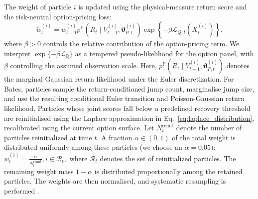\documentclass[sigconf,anonymous,review]{acmart}
\begin{document}
The weight of particle \(i\) is updated using the physical-measure return score and the risk-neutral option-pricing loss:
%
\begin{equation}
\label{eq:joint_weight}
\widetilde{w}_t^{(i)}
=
w_{t-1}^{(i)}
p^{\mathbb{P}}
\left(
R_t \mid V_{t-1}^{(i)},
\boldsymbol{\vartheta}_{P,t}^{(i)}
\right)
\exp\left\{
-\beta
\mathcal{L}_{Q,t}
\left(X_t^{(i)}\right)
\right\}.
\end{equation}
%
where \(\beta>0\) controls the relative contribution of the option-pricing term. We interpret $\exp\{-\beta\mathcal L_{\mathbb Q}\}$ as a tempered pseudo-likelihood for the option panel, with $\beta$ controlling the assumed observation scale. Here,
$p^{\mathbb{P}}(R_t\mid V_{t-1}^{(i)},
\boldsymbol{\vartheta}_{P,t}^{(i)})$
denotes the marginal Gaussian return likelihood under the Euler discretization.
For Bates, particles sample the return-conditioned jump count, marginalise jump size, and use the resulting conditional Euler
transition and Poisson-Gaussian return likelihood. Particles whose joint scores fall below a predefined recovery threshold are reinitialised using the Laplace approximation in Eq.~\eqref{eq:laplace_distribution}, recalibrated using the current option surface. Let \(N_t^{\mathrm{reinit}}\) denote the number of particles reinitialized at time \(t\). A fraction \(\alpha\in(0,1)\) of the total weight is distributed uniformly among these particles (we choose an $\alpha = 0.05)$:
$ w_t^{(i)} =
\frac{\alpha}{N_t^{\mathrm{reinit}}},i\in\mathcal{R}_t,
$
where \(\mathcal{R}_t\) denotes the set of reinitialized particles. The remaining weight mass \(1-\alpha\) is distributed proportionally among the retained particles. The weights are then normalised, and systematic resampling is performed \cite{kitagawa1996monte, douc2005resampling}.
\end{document}
